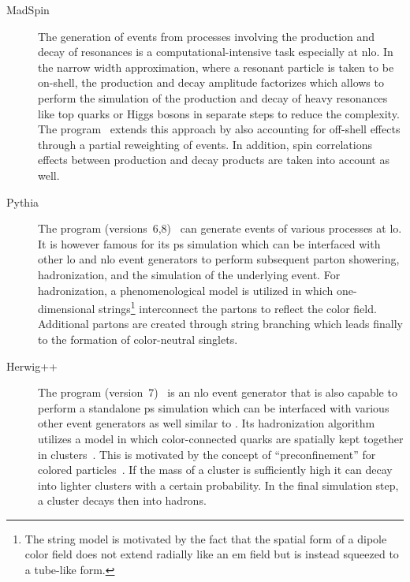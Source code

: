 \begin{description}
\item[MadSpin] The generation of events from processes involving the production and decay of resonances is a computational-intensive task especially at \gls{nlo}. In the narrow width approximation, where a resonant particle is taken to be on-shell, the production and decay amplitude factorizes which allows to perform the simulation of the production and decay of heavy resonances like top quarks or Higgs bosons in separate steps to reduce the complexity. The \MADSPIN[format=hyperbf] program~\cite{Artoisenet:2012st} extends this approach by also accounting for off-shell effects through a partial reweighting of events. In addition, spin correlations effects between production and decay products are taken into account as well.

\item[Pythia] The \PYTHIA[format=hyperbf] program (versions~6,8)~\cite{Sjostrand:2006za,Sjostrand:2014zea} can generate events of various processes at \gls{lo}. It is however famous for its \gls{ps} simulation which can be interfaced with other \gls{lo} and \gls{nlo} event generators to perform subsequent parton showering, hadronization, and the simulation of the underlying event. For hadronization, a phenomenological model is utilized in which one-dimensional strings\footnote{The string model is motivated by the fact that the spatial form of a dipole color field does not extend radially like an \gls{em} field but is instead squeezed to a tube-like form.} interconnect the partons to reflect the color field. Additional partons are created through string branching which leads finally to the formation of color-neutral singlets.

\item[Herwig++] The \HERWIG[format=hyperbf] program (version~7)~\cite{Bellm:2015jjp} is an \gls{nlo} event generator that is also capable to perform a standalone \gls{ps} simulation which can be interfaced with various other event generators as well similar to \PYTHIA. Its hadronization algorithm utilizes a model in which color-connected quarks are spatially kept together in clusters~\cite{Webber:1983if}. This is motivated by the concept of ``preconfinement'' for colored particles~\cite{Amati:1979fg}. If the mass of a cluster is sufficiently high it can decay into lighter clusters with a certain probability. In the final simulation step, a cluster decays then into hadrons.
\end{description}


